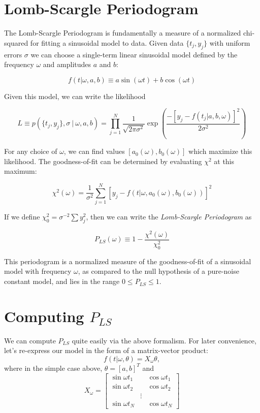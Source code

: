 \documentclass[12pt,pdftex]{article}
\begin{document}
\section{Lomb-Scargle Periodogram}
The Lomb-Scargle Periodogram is fundamentally a measure of a normalized chi-squared for fitting a sinusoidal model to data. Given data $\{t_j, y_j\}$ with uniform errors $\sigma$ we can choose a single-term linear sinusoidal model defined by the frequency $\omega$ and amplitudes $a$ and $b$:

\begin{equation}
  f(t|\omega, a, b) \equiv a\sin(\omega t) + b\cos(\omega t)
\end{equation}

Given this model, we can write the likelihood

\begin{equation}
  L \equiv p(\{t_j, y_j\}, \sigma~|~\omega, a, b) =
  \prod_{j=1}^{N} \frac{1}{\sqrt{2\pi\sigma^2}} \exp\left(
  \frac{-[y_j - f(t_j|a, b, \omega)]^2}{2\sigma^2}
  \right)
\end{equation}

For any choice of $\omega$, we can find values $[a_0(\omega), b_0(\omega)]$ which maximize this likelihood. The goodness-of-fit can be determined by evaluating $\chi^2$ at this maximum:

\begin{equation}
  \chi^2(\omega) = \frac{1}{\sigma^2}\sum_{j=1}^N[y_j - f(t|\omega, a_0(\omega), b_0(\omega))]^2
\end{equation}

If we define $\chi_0^2 = \sigma^{-2}\sum y_j^2$, then we can write the {\it Lomb-Scargle Periodogram} as

\begin{equation}
  P_{LS}(\omega) \equiv 1 - \frac{\chi^2(\omega)}{\chi_0^2}
\end{equation}

This periodogram is a normalized measure of the goodness-of-fit of a sinusoidal model with frequency $\omega$, as compared to the null hypothesis of a pure-noise constant model, and lies in the range $0 \le P_{LS} \le 1$.

\section{Computing $P_{LS}$}
We can compute $P_{LS}$ quite easily via the above formalism.
For later convenience, let's re-express our model in the form of a matrix-vector product:
\begin{equation}
  f(t|\omega, \theta) = X_\omega \theta,
\end{equation}
where in the simple case above, $\theta = [a, b]^T$ and
\begin{equation}
  X_\omega = \left[\begin{array}{lll}
    \sin\omega t_1 && \cos\omega t_1\\
    \sin\omega t_2 && \cos\omega t_2\\
     & \vdots &\\
    \sin\omega t_N && \cos\omega t_N
  \end{array}\right]
\end{equation}
\end{document}
